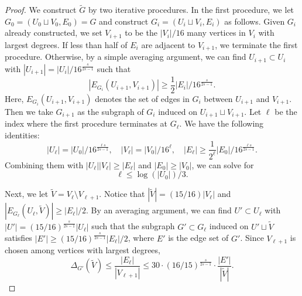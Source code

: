\documentclass[10pt,a4paper]{amsart}
\begin{document}
\begin{proof}
    We construct $\tilde{G}$ by two iterative procedures. In the first procedure, we let $G_0 = (U_0\sqcup V_0, E_0) = G$ and construct $G_i = (U_i\sqcup V_i, E_i)$ as follows. Given $G_i$ already constructed, we set $V_{i+1}$ to be the $|V_i|/16$ many vertices in $V_i$ with largest degrees. If less than half of $E_i$ are adjacent to $V_{i+1}$, we terminate the first procedure. Otherwise, by a simple averaging argument, we can find $U_{i+1} \subset U_i$ with $|U_{i+1}| = |U_i|/16^{\frac{s}{2s-1}}$ such that \begin{equation*}
        |E_{G_i}(U_{i+1}, V_{i+1})| \geq \frac{1}{2}|E_i|/16^{\frac{s}{2s-1}}.
    \end{equation*} Here, $E_{G_i}(U_{i+1}, V_{i+1})$ denotes the set of edges in $G_i$ between $U_{i+1}$ and $V_{i+1}$. Then we take $G_{i+1}$ as the subgraph of $G_i$ induced on $U_{i+1} \sqcup V_{i+1}$. Let $\ell$ be the index where the first procedure terminates at $G_{\ell}$. We have the following identities:\begin{equation*}
        |U_{\ell}| = |U_0|/16^{\frac{\ell s}{2s-1}},\quad |V_\ell| = |V_0|/16^\ell,\quad |E_\ell| \geq \frac{1}{2^\ell}|E_0|/16^{\frac{\ell s}{2s-1}}.
    \end{equation*} Combining them with $|U_\ell||V_\ell|\geq|E_\ell|$ and $|E_0| \geq |V_0|$, we can solve for \begin{equation}\label{eq:biregular_ell}
        \ell \leq \log(|U_0|)/3.
    \end{equation}

    Next, we let $\tilde{V} = V_\ell \setminus V_{\ell+1}$. Notice that $|\tilde{V}| = (15/16)|V_\ell|$ and $|E_{G_\ell}(U_\ell, \tilde{V})| \geq |E_\ell|/2$. By an averaging argument, we can find $U' \subset U_\ell$ with $|U'| = (15/16)^{\frac{s}{2s-1}}|U_\ell|$ such that the subgraph $G'\subset G_\ell$ induced on $U' \sqcup \tilde{V}$ satisfies $|E'| \geq (15/16)^{\frac{s}{2s-1}}|E_\ell|/2$, where $E'$ is the edge set of $G'$. Since $V_{\ell+1}$ is chosen among vertices with largest degrees, \begin{equation}\label{eq:biregular_B}
        \Delta_{G'}(\tilde{V}) \leq \frac{|E_{\ell}|}{|V_{\ell+1}|} \leq 30 \cdot (16/15)^{\frac{s}{2s-1}} \cdot \frac{|E'|}{|\tilde{V}|}.
    \end{equation}
    

\end{proof}
\end{document}
